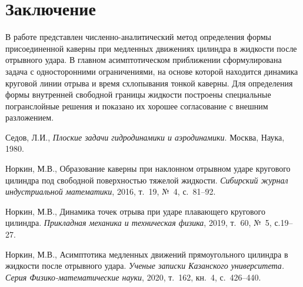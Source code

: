 \documentclass[press]{vestnik}
\begin{document}
\section*{Заключение}

В работе представлен численно-аналитический метод определения формы 
присоединенной каверны при медленных движениях цилиндра в жидкости после 
отрывного удара. В главном асимптотическом приближении сформулирована задача 
с односторонними ограничениями, на основе которой находится динамика 
круговой линии отрыва и время схлопывания тонкой каверны. Для определения 
формы внутренней свободной границы жидкости построены специальные 
погранслойные решения и показано их хорошее согласование с внешним 
разложением. 

\begin{thebibliography}{10}
Седов, Л.И., \textit{Плоские задачи гидродинамики и аэродинамики}. Москва, Наука, 1980. 

Норкин, М.В., Образование каверны при наклонном отрывном ударе кругового цилиндра под свободной поверхностью тяжелой жидкости. \textit{Сибирский журнал индустриальной математики}, 2016, т.~19, №~4, с.~81--92.  

Норкин, М.В., Динамика точек отрыва при ударе плавающего кругового цилиндра. \textit{Прикладная механика и техническая физика}, 2019, т.~60, №~5, с.19--27.  

Норкин, М.В., Асимптотика медленных движений прямоугольного цилиндра в жидкости после отрывного удара. \textit{Ученые записки Казанского университета. Серия Физико-математические науки}, 2020, т.~162, кн.~4, с.~426--440.  


\end{thebibliography}
\end{document}
